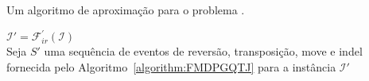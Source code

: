 \begin{algorithm}[!tbh]
  \caption{Um algoritmo de aproximação para o problema \SbFIRTMI{}.\label{algorithm:PJTWIANQ}}
  $\mathcal{I}' = \mathcal{F}_{ir}^{'}(\mathcal{I})$ \\
  Seja $S'$ uma sequência de eventos de reversão, transposição, move e indel fornecida pelo Algoritmo~\ref{algorithm:FMDPGQTJ} para a instância $\mathcal{I}'$ \\
\end{algorithm}